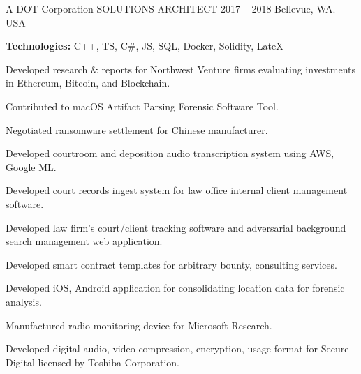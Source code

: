 \begin{cventries}
  \cventry
    {A DOT Corporation} %
    {SOLUTIONS ARCHITECT } %
    {2017 – 2018} %
    {Bellevue, WA. USA} %
    {
    \begin{cvitems} %
        \item \textbf{Technologies:} C++, TS, C#, JS, SQL, Docker, Solidity, LateX
        \item Developed research \& reports for Northwest Venture firms evaluating investments in Ethereum, Bitcoin, and Blockchain.
        \item Contributed to macOS Artifact Parsing Forensic Software Tool.
        \item Negotiated ransomware settlement for Chinese manufacturer.
     \end{cvitems}
    }
  \vspace{-3mm}
  \cventry
    { } %
    { } %
    { } %
    { } %
    {
    \begin{cvitems} %
        \item Developed courtroom and deposition audio transcription system using AWS, Google ML.
        \item Developed court records ingest system for law office internal client management software.
        \item Developed law firm’s court/client tracking software and adversarial background search management web application.
        \item Developed smart contract templates for arbitrary bounty, consulting services.
        \item Developed iOS, Android application for consolidating location data for forensic analysis.
        \item Manufactured radio monitoring device for Microsoft Research.
        \item Developed digital audio, video compression, encryption, usage format for Secure Digital licensed by Toshiba Corporation.
    \end{cvitems}
    }
 

\end{cventries}
